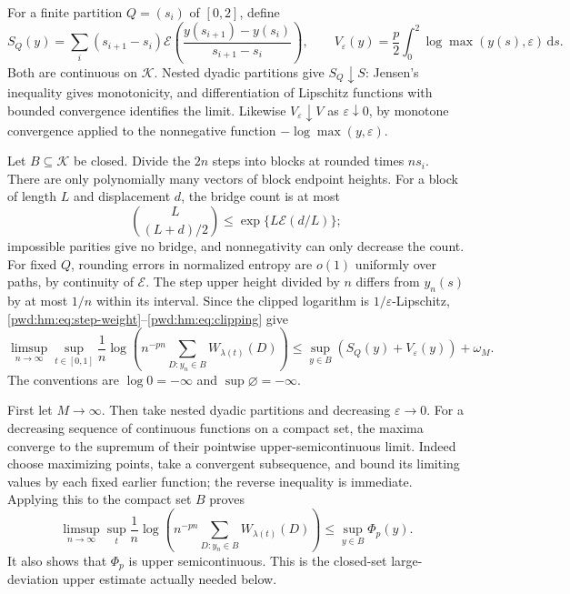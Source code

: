 \documentclass[11pt,letterpaper]{article}
\numberwithin{equation}{section}
\theoremstyle{remark}\newtheorem{remark}[theorem]{Remark}
\newcommand{\K}{\mathcal K}\newcommand{\ee}{\mathrm e}\newcommand{\dd}{\,\mathrm d}
\begin{document}
For a finite partition $Q=(s_i)$ of $[0,2]$, define
\[
 S_Q(y)=\sum_i(s_{i+1}-s_i)\mathcal E\left(\frac{y(s_{i+1})-y(s_i)}{s_{i+1}-s_i}\right),\qquad
 V_\varepsilon(y)=\frac p2\int_0^2\log\max(y(s),\varepsilon)\dd s.
\]
Both are continuous on $\K$. Nested dyadic partitions give $S_Q\downarrow S$: Jensen's inequality gives monotonicity, and differentiation of Lipschitz functions with bounded convergence identifies the limit. Likewise $V_\varepsilon\downarrow V$ as $\varepsilon\downarrow0$, by monotone convergence applied to the nonnegative function $-\log\max(y,\varepsilon)$.

Let $B\subseteq\K$ be closed. Divide the $2n$ steps into blocks at rounded times $ns_i$. There are only polynomially many vectors of block endpoint heights. For a block of length $L$ and displacement $d$, the bridge count is at most
\[
 \binom{L}{(L+d)/2}\le\exp\{L\mathcal E(d/L)\};
\]
impossible parities give no bridge, and nonnegativity can only decrease the count. For fixed $Q$, rounding errors in normalized entropy are $o(1)$ uniformly over paths, by continuity of $\mathcal E$. The step upper height divided by $n$ differs from $y_n(s)$ by at most $1/n$ within its interval. Since the clipped logarithm is $1/\varepsilon$-Lipschitz, \eqref{pwd:hm:eq:step-weight}--\eqref{pwd:hm:eq:clipping} give
\begin{equation}\label{pwd:hm:eq:clipped-upper}
 \limsup_{n\to\infty}\sup_{t\in[0,1]}\frac1n
 \log\left(n^{-pn}\sum_{D:y_n\in B}W_{\lambda(t)}(D)\right)
 \le\sup_{y\in B}(S_Q(y)+V_\varepsilon(y))+\omega_M.
\end{equation}
The conventions are $\log0=-\infty$ and $\sup\varnothing=-\infty$.

First let $M\to\infty$. Then take nested dyadic partitions and decreasing $\varepsilon\to0$. For a decreasing sequence of continuous functions on a compact set, the maxima converge to the supremum of their pointwise upper-semicontinuous limit. Indeed choose maximizing points, take a convergent subsequence, and bound its limiting values by each fixed earlier function; the reverse inequality is immediate. Applying this to the compact set $B$ proves
\begin{equation}\label{pwd:hm:eq:closed-upper}
 \limsup_{n\to\infty}\sup_t\frac1n
 \log\left(n^{-pn}\sum_{D:y_n\in B}W_{\lambda(t)}(D)\right)
 \le\sup_{y\in B}\Phi_p(y).
\end{equation}
It also shows that $\Phi_p$ is upper semicontinuous. This is the closed-set large-deviation upper estimate actually needed below.
\end{document}
